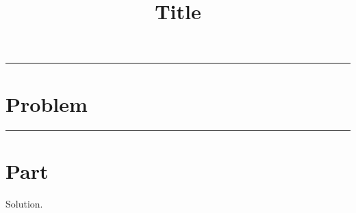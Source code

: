 \documentclass[hidelinks, 11pt, dvipsnames]{article}
\title{Title}
\newcommand{\psection}[1]{{
    \begin{center}
        \noindent \rule{17cm}{0.4pt}
            \section*{\LARGE #1}
        \noindent \rule{17cm}{0.4pt}
    \end{center}
}}
\newcommand{\psubsection}[1]{{\section*{#1}}}
\begin{document}
\maketitle

\psection{Problem}

\psubsection{Part}

\noindent
Solution.
\end{document}
